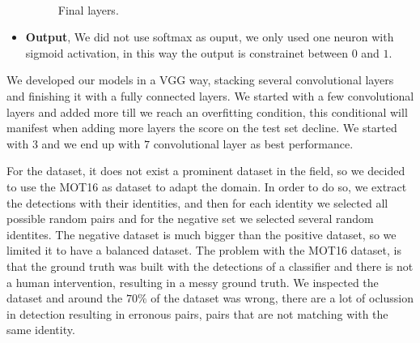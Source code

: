 \documentclass[12pt, a4paper, titlepage,twoside,openright]{article}
\begin{document}
\begin{itemize}
\begin{figure}[H]
\\



\caption{Final layers.}
\label{siameseData2}
\end{figure}


\item \textbf{Output}, We did not use softmax as ouput, we only used one neuron with sigmoid activation, in this way the output is constrainet between $0$ and $1$.



\end{itemize}

  

We developed our models in a VGG way, stacking  several convolutional layers and finishing it with a fully connected layers. We started with a few convolutional layers and added more till we reach an overfitting condition, this conditional will manifest when adding more layers the score on the test set decline. We started with $3$ and we end up with $7$ convolutional layer as best performance.

For the dataset, it does not exist a prominent dataset in the field, so we decided to use the MOT16 as dataset to adapt the domain. In order to do so, we extract the detections with their identities, and then for each identity we selected all possible random pairs and for the negative set we selected several random identites. The negative dataset is much bigger than the positive dataset, so we limited it to have a balanced dataset. The problem with the MOT16 dataset, is that the ground truth was built with the detections of a classifier and there is not a human intervention, resulting in a messy ground truth. We inspected the dataset and around the $70 \%$ of the dataset was wrong, there are a lot of oclussion in detection resulting in erronous pairs, pairs that are not matching with the same identity.
\end{document}
